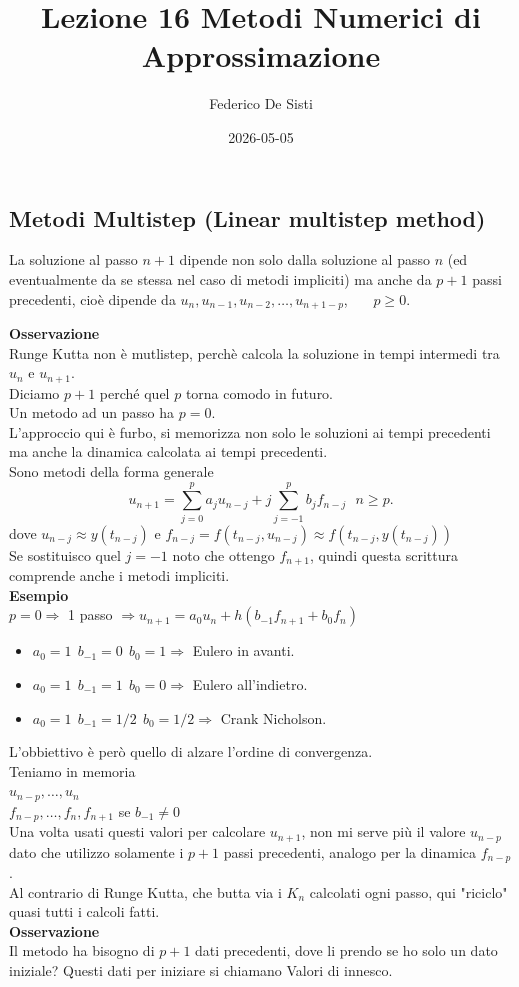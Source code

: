 \documentclass[12px]{article}
\title{Lezione 16 Metodi Numerici di Approssimazione}
\date{2026-05-05}
\author{Federico De Sisti}
\begin{document}
	\maketitle
	\newpage
	\subsection{Metodi Multistep (Linear multistep method)}
	\begin{defi}
	La soluzione al passo $n+1$ dipende non solo dalla soluzione al passo $n$ (ed eventualmente da se stessa nel caso di metodi impliciti) ma anche da $p+1$ passi precedenti, cioè dipende da $u_n,u_{n-1},u_{n-2}, \ldots,u_{n+1-p}$, \ \ \ $p\geq 0$.\\
	\end{defi}
	\textbf{Osservazione}\\
	Runge Kutta non è mutlistep, perchè calcola la soluzione in tempi intermedi tra $u_n$ e $u_{n+1}$.\\
	Diciamo $p+1$ perché quel $p$ torna comodo in futuro.\\
	Un metodo ad un passo ha $p=0$.\\
	L'approccio qui è furbo, si memorizza non solo le soluzioni ai tempi precedenti ma anche la dinamica calcolata ai tempi precedenti.\\
	Sono metodi della forma generale
	\[
		u_{n+1} = \sum^{p}_{j=0}a_ju_{n-j} + j \sum_{j={-1}}^{p}b_jf_{n-j} \ \ \ n\geq p
	.\] 
	dove $u_{n-j} \approx y(t_{n-j})$ e  $f_{n-j} = f(t_{n-j},u_{n-j})\approx f(t_{n-j}, y(t_{n-j}))$\\
	Se sostituisco quel  $j=-1$ noto che ottengo  $f_{n+1}$, quindi questa scrittura comprende anche i metodi impliciti.\\
	\textbf{Esempio} \\
	$p = 0 \Rightarrow  $ 1 passo $ \Rightarrow u_{n+1} = a_0u_n + h(b_{-1}f_{n+1}+b_0f_n)$ 
	\begin{itemize}
		\item $a_0 = 1 \ \ b_{-1} = 0 \ \ b_0 = 1 \Rightarrow  $ Eulero in avanti.
		\item $a_0 = 1 \ \  b_{-1} = 1 \ \ b_0 = 0 \Rightarrow  $ Eulero all'indietro.
		\item $a_0 = 1 \ \ b_{-1} = 1/2 \ \ b_0 = 1/2 \Rightarrow  $ Crank Nicholson.
	\end{itemize}
	L'obbiettivo è però quello di alzare l'ordine di convergenza.\\
	Teniamo in memoria\\
	$u_{n-p},\ldots,u_n$\\
	$f_{n-p}, \ldots, f_n, f_{n+1}$ se  $b_{-1}\neq 0$\\
	Una volta usati questi valori per calcolare  $u_{n+1}$, non mi serve più il valore  $u_{n-p}$ dato che utilizzo solamente i  $p+1$ passi precedenti, analogo per la dinamica $f_{n-p}$.\\
	Al contrario di Runge Kutta, che butta via i  $K_n$ calcolati ogni passo, qui "riciclo" quasi tutti i calcoli fatti.\\
\textbf{Osservazione}\\
Il metodo ha bisogno di $p+1$ dati precedenti, dove li prendo se ho solo un dato iniziale? Questi dati per iniziare si chiamano Valori di innesco.
\newpage
\end{document}
